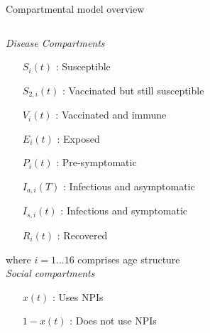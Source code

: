 \documentclass{beamer}
\begin{document}
\begin{frame}{Compartmental model overview}
    \begin{columns}
        \begin{column}{0.4\textwidth}
        \scriptsize
        \textit{Disease Compartments}
            \begin{itemize}
                \item[$S_i(t)$] : Susceptible
                \item[$S_{2,i}(t)$] : Vaccinated but still susceptible
                \item[$V_i(t)$] : Vaccinated and immune 
                \item[$E_i(t)$] : Exposed 
                \item[$P_i(t)$] : Pre-symptomatic
                \item[$I_{a,i}(T)$] : Infectious and asymptomatic
                \item[$I_{s,i}(t)$] : Infectious and symptomatic
                \item[$R_i(t)$] : Recovered 
            \end{itemize}
        \tiny{where $i = 1 ... 16$} comprises age structure\\
        \footnotesize
        \vspace{0.1cm}
        \textit{Social compartments}
        \begin{itemize}
            \item[$x(t)$] : Uses NPIs
            \item[$1 - x(t)$] : Does not use NPIs
        \end{itemize}

        \end{column}

        \begin{column}{0.4\textwidth}
            \small


            \begin{figure}
                \begin{tikzpicture}[node distance=0.8cm, auto,
                    >=Latex, 
                    every node/.append style={align=center},
                    int/.style={draw, minimum size=0.5cm}]
                

\end{tikzpicture}
\end{figure}
\end{column}
\end{columns}
\end{frame}
\end{document}
